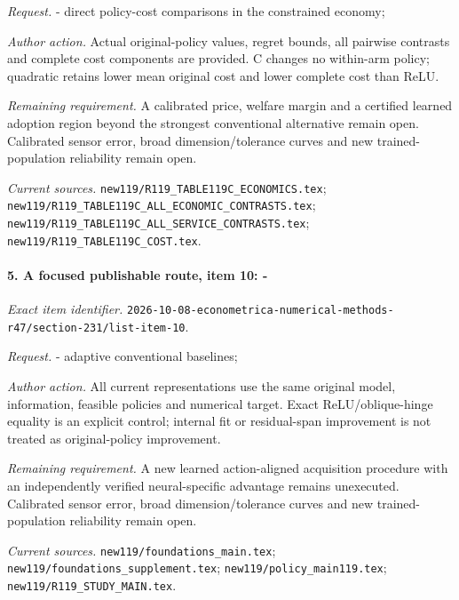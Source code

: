 \par\emph{Request.} - direct policy-cost comparisons in the constrained economy;

\par\emph{Author action.} Actual original-policy values, regret bounds, all pairwise contrasts and complete cost components are provided. C changes no within-arm policy; quadratic retains lower mean original cost and lower complete cost than ReLU.

\par\emph{Remaining requirement.} A calibrated price, welfare margin and a certified learned adoption region beyond the strongest conventional alternative remain open. Calibrated sensor error, broad dimension/\allowbreak{}tolerance curves and new trained-population reliability remain open.

\par\emph{Current sources.} \nolinkurl{new119/R119_TABLE119C_ECONOMICS.tex}; \nolinkurl{new119/R119_TABLE119C_ALL_ECONOMIC_CONTRASTS.tex}; \nolinkurl{new119/R119_TABLE119C_ALL_SERVICE_CONTRASTS.tex}; \nolinkurl{new119/R119_TABLE119C_COST.tex}.

\paragraph{5. A focused publishable route, item 10: -}

\emph{Exact item identifier.} \nolinkurl{2026-10-08-econometrica-numerical-methods-r47/section-231/list-item-10}.

\par\emph{Request.} - adaptive conventional baselines;

\par\emph{Author action.} All current representations use the same original model, information, feasible policies and numerical target. Exact ReLU/\allowbreak{}oblique-hinge equality is an explicit control; internal fit or residual-span improvement is not treated as original-policy improvement.

\par\emph{Remaining requirement.} A new learned action-aligned acquisition procedure with an independently verified neural-specific advantage remains unexecuted. Calibrated sensor error, broad dimension/\allowbreak{}tolerance curves and new trained-population reliability remain open.

\par\emph{Current sources.} \nolinkurl{new119/foundations_main.tex}; \nolinkurl{new119/foundations_supplement.tex}; \nolinkurl{new119/policy_main119.tex}; \nolinkurl{new119/R119_STUDY_MAIN.tex}.

